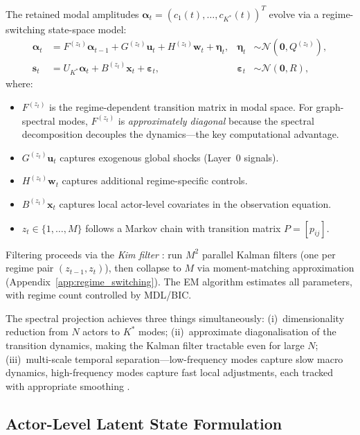 \documentclass[11pt,a4paper]{article}
\theoremstyle{definition}
\newcommand{\bx}{\bm{x}}
\newcommand{\bs}{\bm{s}}
\newcommand{\bu}{\bm{u}}
\newcommand{\balpha}{\bm{\alpha}}
\begin{document}
The retained modal amplitudes $\balpha_t = (c_1(t), \ldots, c_{K^*}(t))^T$ evolve via a regime-switching state-space model:
\begin{align}
  \balpha_t &= F^{(z_t)} \balpha_{t-1} + G^{(z_t)} \bu_t + H^{(z_t)} \bm{w}_t + \bm{\eta}_t,
  & \bm{\eta}_t &\sim \mathcal{N}(\bm{0}, Q^{(z_t)}),
  \label{eq:state}\\[4pt]
  \bs_t &= U_{K^*} \balpha_t + B^{(z_t)} \bx_t + \bm{\varepsilon}_t,
  & \bm{\varepsilon}_t &\sim \mathcal{N}(\bm{0}, R),
  \label{eq:obs}
\end{align}
where:
\begin{itemize}[nosep]
  \item $F^{(z_t)}$ is the regime-dependent transition matrix in modal space. For graph-spectral modes, $F^{(z_t)}$ is \emph{approximately diagonal} because the spectral decomposition decouples the dynamics---the key computational advantage.
  \item $G^{(z_t)} \bu_t$ captures exogenous global shocks (Layer~0 signals).
  \item $H^{(z_t)} \bm{w}_t$ captures additional regime-specific controls.
  \item $B^{(z_t)} \bx_t$ captures local actor-level covariates in the observation equation.
  \item $z_t \in \{1, \ldots, M\}$ follows a Markov chain with transition matrix $P = [p_{ij}]$.
\end{itemize}

Filtering proceeds via the \emph{Kim filter} \citep{kim1999state}: run $M^2$ parallel Kalman filters (one per regime pair $(z_{t-1}, z_t)$), then collapse to $M$ via moment-matching approximation (Appendix~\ref{app:regime_switching}). The EM algorithm estimates all parameters, with regime count controlled by MDL/BIC.

\begin{keybox}
The spectral projection achieves three things simultaneously:
(i)~dimensionality reduction from $N$ actors to $K^*$ modes;
(ii)~approximate diagonalisation of the transition dynamics, making the Kalman filter tractable even for large $N$;
(iii)~multi-scale temporal separation---low-frequency modes capture slow macro dynamics, high-frequency modes capture fast local adjustments, each tracked with appropriate smoothing \citep{durbin2012time}.
\end{keybox}

\subsection{Actor-Level Latent State Formulation}
\label{sec:actor_level}
\end{document}
